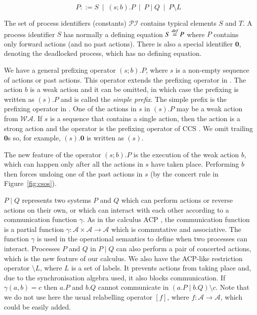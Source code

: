 \documentclass[review]{elsarticle}
\newcommand{\paral}{\; \vert \;}
\newcommand{\restrict}[1]{\!\setminus\!#1}
\newcommand{\mA}{\mathcal{A}}
\newcommand{\mWA}{\mathcal{WA}}
\newcommand{\PI}{\mathcal{PI}}
\newcommand{\Nil}{\mathbf{0}}
\newcommand{\bydef}{\stackrel{\emph{def}}{=}}
\newcommand{\Comment}[1]{}
\newcommand{\rulename}[1]{\textsf{#1}}
\begin{document}
$$P ::=  S \ \mid \ (s;b).P \ \mid \ P\paral Q \ \mid \ P\restrict L $$

The set of process identifiers (constants) $\PI$ contains typical elements $S$ and $T$. 
A process identifier $S$ has normally a defining equation $S\bydef P$ where $P$ contains only forward 
actions (and no past actions). There is also a special identifier
 $\Nil$, denoting the deadlocked process, which has no defining equation.

We have a general prefixing operator
$(s;b).P$, where $s$ is a non-empty sequence of actions or past actions. This operator
extends the prefixing operator in \cite{Irek2012}. The action $b$ is a weak action
and it can be omitted, in which case the prefixing is written as $(s).P$ and is called the
\emph{simple prefix}. The simple prefix is the prefixing operator in \cite{Irek2012}. 
One of the actions in $s$ in $(s).P$ may be a weak action from $\mWA$. If $s$ is a sequence that contains   
a single action, then the action is a strong action and the operator 
is the prefixing operator of CCS \cite{Milner1980}.
We omit trailing $\Nil$s so, for example, $(s).\Nil$ is written as $(s)$.
%
%
\Comment{\Stefan{We will only use cases in this paper where processes are of the form $(s).\Nil$. We still have the possibility of 
processes like $(s).(s').\Nil$ in our calculus. This could be used to model protein functions in biological systems, for example 
base excision repair (\cite{Koehler2014}. For this a protein ``walks'' along a strand of DNA and repairs faults which occurred in 
DNA replication. Such a protein could be modelled by having the walk modelled in $s$ and the repair mechanism in $s'$, combining them to a model like $(s).(s').\Nil$.}
}
%
%
The new feature of the operator $(s;b).P$ is the execution of the weak action $b$, which
can happen only after all the actions in $s$ have taken place. Performing $b$ then forces
undoing one of the past actions in $s$ (by the \rulename{concert} rule in Figure~\ref{fig:csos}).

$P\paral Q$ represents two systems $P$ and $Q$ which can perform actions or reverse actions on
their own, or which can interact with each other according to a communication function
$\gamma$. As in the calculus ACP \cite{ACPBook}, the communication function is a partial function 
$\gamma: \mathcal A \times \mathcal A \rightarrow \mathcal A$ which is commutative and associative. The function
$\gamma$ is used in the operational semantics to define when two processes can interact. Processes 
$P$ and $Q$ in $P\paral Q$ can also perform a pair of concerted actions,
which is the new feature of our calculus.  We also have the ACP-like restriction operator 
$\setminus L$, where $L$ is a set of labels. It prevents actions from taking place and, due to 
the synchronisation algebra used, it also blocks communication. If $\gamma(a,b)=c$ then $a.P$ and $b.Q$
cannot communicate in $(a.P\paral b.Q)\setminus c$.
Note that we do not use here the usual relabelling 
operator $[f]$, where $f: \mA \rightarrow \mA$, which could be easily added.
\end{document}
